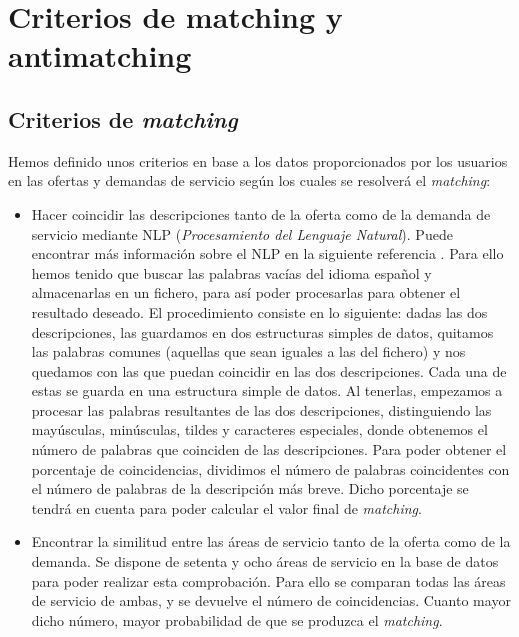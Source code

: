 \documentclass[11pt]{book}
\begin{document}
	\section{Criterios de matching y antimatching}
	\subsection{Criterios de \textit{matching} }
	
	Hemos definido unos criterios en base a los datos proporcionados por los usuarios en las ofertas y demandas de servicio según los cuales se resolverá el \emph{matching}:
	
	\begin{itemize} 	
		\item Hacer coincidir las descripciones tanto de la oferta como de la demanda de servicio mediante NLP (\textit{Procesamiento del Lenguaje Natural}). Puede encontrar más información sobre el NLP en la siguiente referencia \cite{marti2002tratamiento}.
		Para ello hemos tenido que buscar las palabras vacías del idioma español y almacenarlas en un fichero, para así poder procesarlas para obtener el resultado deseado. El procedimiento consiste en lo siguiente: dadas las dos descripciones, las guardamos en dos estructuras simples de datos, quitamos las palabras comunes (aquellas que sean iguales a las del fichero) y nos quedamos con las que puedan coincidir en las dos descripciones. Cada una de estas se guarda en una estructura simple de datos. Al tenerlas, empezamos a procesar las palabras resultantes de las dos descripciones, distinguiendo las mayúsculas, minúsculas, tildes y caracteres especiales, donde obtenemos el número de palabras que coinciden de las descripciones. Para poder obtener el porcentaje de coincidencias, dividimos el número de palabras coincidentes con el número de palabras de la descripción más breve. Dicho porcentaje se tendrá en cuenta para poder calcular el valor final de \emph{matching}.
		
		\item Encontrar la similitud entre las áreas de servicio tanto de la oferta como de la demanda. Se dispone de setenta y ocho áreas de servicio en la base de datos para poder realizar esta comprobación. Para ello se comparan todas las áreas de servicio de ambas, y se devuelve el número de coincidencias. Cuanto mayor dicho número, mayor probabilidad de que se produzca el \emph{matching}.
		

\end{itemize}
\end{document}
